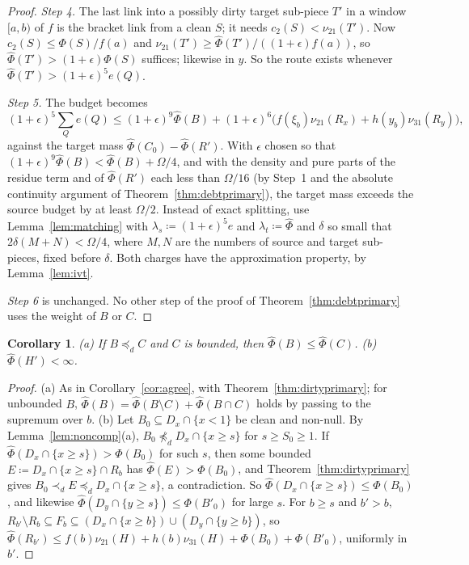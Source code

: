 \documentclass[11pt]{article}
\newtheorem{corollary}[theorem]{Corollary}
\theoremstyle{definition}\newtheorem{definition}[theorem]{Definition}
\theoremstyle{remark}\newtheorem{remark}[theorem]{Remark}
\newcommand{\Phihat}{\widehat\Phi}
\begin{document}
\begin{proof}
\emph{Step 4.} The last link into a possibly dirty target sub-piece $T'$ in a
window $[a,b)$ of $f$ is the bracket link from a clean $S$; it needs
$c_2(S)<\nu_{21}(T')$. Now $c_2(S)\le\Phi(S)/f(a)$ and $\nu_{21}(T')\ge
\Phihat(T')/((1+\epsilon)f(a))$, so $\Phihat(T')>(1+\epsilon)\Phi(S)$
suffices; likewise in $y$. So the route exists whenever
$\Phihat(T')>(1+\epsilon)^5e(Q)$.

\emph{Step 5.} The budget becomes
\[
 (1+\epsilon)^5\sum_Qe(Q)\le(1+\epsilon)^9\Phihat(B)+(1+\epsilon)^6
 \bigl(f(\xi_b)\nu_{21}(R_x)+h(y_b)\nu_{31}(R_y)\bigr),
\]
against the target mass $\Phihat(C_0)-\Phihat(R')$. With $\epsilon$ chosen
so that $(1+\epsilon)^9\Phihat(B)<\Phihat(B)+\Omega/4$, and with the
density and pure parts of the residue term and of $\Phihat(R')$ each less
than $\Omega/16$ (by Step~1 and the absolute continuity argument of
Theorem~\ref{thm:debtprimary}), the target mass exceeds the source budget by
at least $\Omega/2$. Instead of exact splitting, use
Lemma~\ref{lem:matching} with $\lambda_s\coloneqq(1+\epsilon)^5e$ and
$\lambda_t\coloneqq\Phihat$ and $\delta$ so small that $2\delta(M+N)<
\Omega/4$, where $M,N$ are the numbers of source and target sub-pieces,
fixed before $\delta$. Both charges have the approximation property, by
Lemma~\ref{lem:ivt}.

\emph{Step 6} is unchanged. No other step of the proof of
Theorem~\ref{thm:debtprimary} uses the weight of $B$ or $C$.
\end{proof}

\begin{corollary}\label{cor:dirtyagree}
(a) If $B\preceq_dC$ and $C$ is bounded, then $\Phihat(B)\le\Phihat(C)$.
(b) $\Phihat(H')<\infty$.
\end{corollary}
\begin{proof}
(a) As in Corollary~\ref{cor:agree}, with Theorem~\ref{thm:dirtyprimary}; for
unbounded $B$, $\Phihat(B)=\Phihat(B\setminus C)+\Phihat(B\cap C)$ holds by
passing to the supremum over $b$. (b) Let $B_0\subseteq D_x\cap\{x<1\}$ be
clean and non-null. By Lemma~\ref{lem:noncomp}(a), $B_0\not\preceq_d
D_x\cap\{x\ge s\}$ for $s\ge S_0\ge1$. If $\Phihat(D_x\cap\{x\ge s\})>
\Phi(B_0)$ for such $s$, then some bounded $E\coloneqq D_x\cap\{x\ge s\}\cap
R_{b}$ has $\Phihat(E)>\Phi(B_0)$, and Theorem~\ref{thm:dirtyprimary} gives
$B_0\prec_dE\preceq_dD_x\cap\{x\ge s\}$, a contradiction. So
$\Phihat(D_x\cap\{x\ge s\})\le\Phi(B_0)$, and likewise
$\Phihat(D_y\cap\{y\ge s\})\le\Phi(B'_0)$ for large $s$. For $b\ge s$ and
$b'>b$, $R_{b'}\setminus R_b\subseteq F_b\subseteq(D_x\cap\{x\ge b\})\cup
(D_y\cap\{y\ge b\})$, so $\Phihat(R_{b'})\le f(b)\nu_{21}(H)+h(b)\nu_{31}(H)
+\Phi(B_0)+\Phi(B'_0)$, uniformly in $b'$.
\end{proof}
\end{document}
